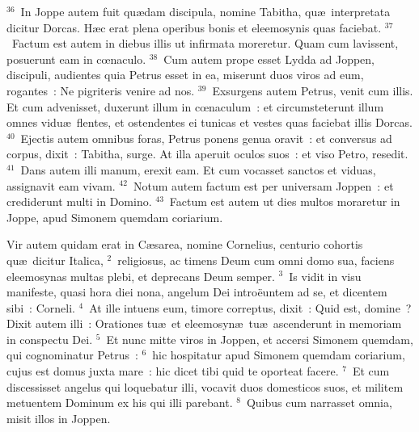 ${}^{36}$~In Joppe autem fuit qu\ae dam discipula, nomine Tabitha, qu\ae\ interpretata dicitur Dorcas. H\ae c erat plena operibus bonis et eleemosynis quas faciebat.
${}^{37}$~Factum est autem in diebus illis ut infirmata moreretur. Quam cum lavissent, posuerunt eam in cœnaculo.
${}^{38}$~Cum autem prope esset Lydda ad Joppen, discipuli, audientes quia Petrus esset in ea, miserunt duos viros ad eum, rogantes~: Ne pigriteris venire ad nos.
${}^{39}$~Exsurgens autem Petrus, venit cum illis. Et cum advenisset, duxerunt illum in cœnaculum~: et circumsteterunt illum omnes vidu\ae\ flentes, et ostendentes ei tunicas et vestes quas faciebat illis Dorcas.
${}^{40}$~Ejectis autem omnibus foras, Petrus ponens genua oravit~: et conversus ad corpus, dixit~: Tabitha, surge. At illa aperuit oculos suos~: et viso Petro, resedit.
${}^{41}$~Dans autem illi manum, erexit eam. Et cum vocasset sanctos et viduas, assignavit eam vivam.
${}^{42}$~Notum autem factum est per universam Joppen~: et crediderunt multi in Domino.
${}^{43}$~Factum est autem ut dies multos moraretur in Joppe, apud Simonem quemdam coriarium.

\lettrine[lines=3,image=true,loversize=0.05,lraise=-0.03]{V}{}ir autem quidam erat in C\ae sarea, nomine Cornelius, centurio cohortis qu\ae\ dicitur Italica,
${}^{2}$~religiosus, ac timens Deum cum omni domo sua, faciens eleemosynas multas plebi, et deprecans Deum semper.
${}^{3}$~Is vidit in visu manifeste, quasi hora diei nona, angelum Dei intro\"euntem ad se, et dicentem sibi~: Corneli.
${}^{4}$~At ille intuens eum, timore correptus, dixit~: Quid est, domine~? Dixit autem illi~: Orationes tu\ae\ et eleemosyn\ae\ tu\ae\ ascenderunt in memoriam in conspectu Dei.
${}^{5}$~Et nunc mitte viros in Joppen, et accersi Simonem quemdam, qui cognominatur Petrus~:
${}^{6}$~hic hospitatur apud Simonem quemdam coriarium, cujus est domus juxta mare~: hic dicet tibi quid te oporteat facere.
${}^{7}$~Et cum discessisset angelus qui loquebatur illi, vocavit duos domesticos suos, et militem metuentem Dominum ex his qui illi parebant.
${}^{8}$~Quibus cum narrasset omnia, misit illos in Joppen.


